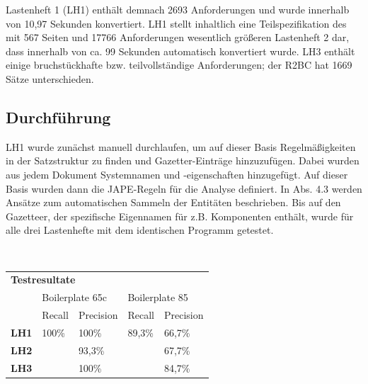 \documentclass[12pt]{report}
\begin{document}
Lastenheft 1 (LH1) enthält demnach 2693 Anforderungen und wurde innerhalb von 10,97 Sekunden konvertiert. LH1 stellt inhaltlich eine Teilspezifikation des mit 567 Seiten und 17766 Anforderungen wesentlich größeren Lastenheft 2 dar, dass innerhalb von ca. 99 Sekunden automatisch konvertiert wurde. LH3 enthält einige bruchstückhafte bzw. teilvollständige Anforderungen; der R2BC hat 1669 Sätze unterschieden.

\subsection{Durchführung}
LH1 wurde zunächst manuell durchlaufen, um auf dieser Basis Regelmäßigkeiten in der Satzstruktur zu finden und Gazetter-Einträge hinzuzufügen. Dabei wurden aus jedem Dokument Systemnamen und -eigenschaften hinzugefügt. Auf dieser Basis wurden dann die JAPE-Regeln für die Analyse definiert. In Abs. 4.3 werden Ansätze zum automatischen Sammeln der Entitäten beschrieben. Bis auf den Gazetteer, der spezifische Eigennamen für z.B. Komponenten enthält, wurde für alle drei Lastenhefte mit dem identischen Programm getestet.

\vspace{12pt}
\begin{table}[h!]
\tt
\begin{tabular}{lllll}
\multicolumn{5}{l}{\textbf{Testresultate}}                                                                            \\
\multicolumn{1}{l|}{}             & \multicolumn{2}{l|}{Boilerplate 65c}    & \multicolumn{2}{l|}{Boilerplate 85}     \\
\multicolumn{1}{l|}{}             & Recall & \multicolumn{1}{l|}{Precision} & Recall & \multicolumn{1}{l|}{Precision} \\ \hline
\multicolumn{1}{l|}{\textbf{LH1}} & 100\%  & \multicolumn{1}{l|}{100\%}     & 89,3\% & \multicolumn{1}{l|}{66,7\%}    \\
\multicolumn{1}{l|}{\textbf{LH2}} &        & \multicolumn{1}{l|}{93,3\%} &  	  &  \multicolumn{1}{l|}{67,7\%}          \\
\multicolumn{1}{l|}{\textbf{LH3}} &   & \multicolumn{1}{l|}{100\%}     & 	  & \multicolumn{1}{l|}{84,7\%}    
\end{tabular}
\rm
{}
\end{table}
\vspace{12pt}
\end{document}
